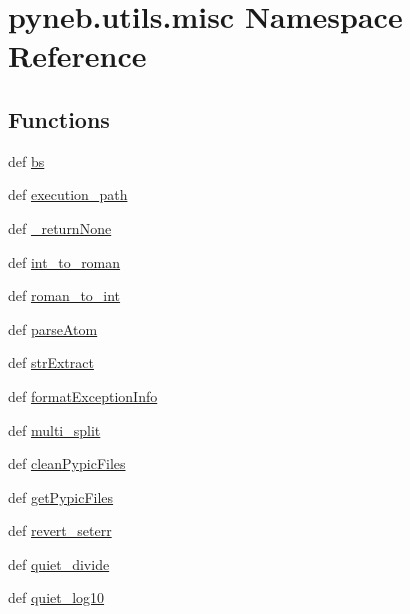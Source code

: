 \hypertarget{namespacepyneb_1_1utils_1_1misc}{\section{pyneb.\-utils.\-misc Namespace Reference}
\label{namespacepyneb_1_1utils_1_1misc}
}
\subsection*{Functions}
\begin{DoxyCompactItemize}
\item 
def \hyperlink{namespacepyneb_1_1utils_1_1misc_ac280e2da31c4a00379cb0b5852ad0d8e}{bs}
\item 
def \hyperlink{namespacepyneb_1_1utils_1_1misc_a937fc19e910346d9d288992e8eeab0ea}{execution\-\_\-path}
\item 
def \hyperlink{namespacepyneb_1_1utils_1_1misc_a7adb0042ec7ea039b5a94fd243a596f1}{\-\_\-return\-None}
\item 
def \hyperlink{namespacepyneb_1_1utils_1_1misc_a7a4c4b4ba1c884da72e0ea05aa8fb90b}{int\-\_\-to\-\_\-roman}
\item 
def \hyperlink{namespacepyneb_1_1utils_1_1misc_ae67dbd6bb48d64216bc162ebdc25a183}{roman\-\_\-to\-\_\-int}
\item 
def \hyperlink{namespacepyneb_1_1utils_1_1misc_a2bb6f906a75f26a882093e9ce9272507}{parse\-Atom}
\item 
def \hyperlink{namespacepyneb_1_1utils_1_1misc_aaf9c5249e3c3104e38854ca30f9df4b7}{str\-Extract}
\item 
def \hyperlink{namespacepyneb_1_1utils_1_1misc_ab2eb7efdb086136e683e7f05f17958a9}{format\-Exception\-Info}
\item 
def \hyperlink{namespacepyneb_1_1utils_1_1misc_aa8d55231b0b2a1223bbd3acd3a1268e2}{multi\-\_\-split}
\item 
def \hyperlink{namespacepyneb_1_1utils_1_1misc_a71fea98dc66e2a1793b5c86a345da052}{clean\-Pypic\-Files}
\item 
def \hyperlink{namespacepyneb_1_1utils_1_1misc_aee812eafa08b828b4c65c700a6cf4ff6}{get\-Pypic\-Files}
\item 
def \hyperlink{namespacepyneb_1_1utils_1_1misc_a1274ea579021bda5ae537337b7dacebd}{revert\-\_\-seterr}
\item 
def \hyperlink{namespacepyneb_1_1utils_1_1misc_a852d66d22ba9e872484b3346dc28249e}{quiet\-\_\-divide}
\item 
def \hyperlink{namespacepyneb_1_1utils_1_1misc_a4ab5392913d261532484092f8856a39a}{quiet\-\_\-log10}

\end{DoxyCompactItemize}
